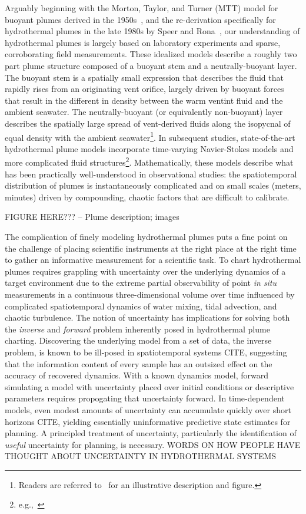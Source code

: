 Arguably beginning with the Morton, Taylor, and Turner (MTT) model for buoyant plumes derived in the 1950s~\autocite{morton1956turbulent}, and the re-derivation specifically for hydrothermal plumes in the late 1980s by Speer and Rona~\autocite{speer1989model}, our understanding of hydrothermal plumes is largely based on laboratory experiments and sparse, corroborating field measurements.
These idealized models describe a roughly two part plume structure composed of a buoyant stem and a neutrally-buoyant layer. 
The buoyant stem is a spatially small expression that describes the fluid that rapidly rises from an originating vent orifice, largely driven by buoyant forces that result in the different in density between the warm ventint fluid and the ambient seawater.
The neutrally-buoyant (or equivalently non-buoyant) layer describes the spatially large spread of vent-derived fluids along the isopycnal of equal density with the ambient seawater\footnote{Readers are referred to~\autocite{yoerger2007autonomous} for an illustrative description and figure.}. 
In subsequent studies, state-of-the-art hydrothermal plume models incorporate time-varying Navier-Stokes models and more complicated fluid structures\footnote{e.g.,~\autocite{lavelle2013turbulent,xu2012deep}}.
Mathematically, these models describe what has been practically well-understood in observational studies: the spatiotemporal distribution of plumes is instantaneously complicated and on small scales (meters, minutes) driven by compounding, chaotic factors that are difficult to calibrate.


FIGURE HERE??? -- Plume description; images


The complication of finely modeling hydrothermal plumes puts a fine point on the challenge of placing scientific instruments at the right place at the right time to gather an informative measurement for a scientific task.
To chart hydrothermal plumes requires grappling with uncertainty over the underlying dynamics of a target environment due to the extreme partial observability of point \emph{in situ} measurements in a continuous three-dimensional volume over time influenced by complicated spatiotemporal dynamics of water mixing, tidal advection, and chaotic turbulence.
The notion of uncertainty has implications for solving both the \emph{inverse} and \emph{forward} problem inherently posed in hydrothermal plume charting.
Discovering the underlying model from a set of data, the inverse problem, is known to be ill-posed in spatiotemporal systems CITE, suggesting that the information content of every sample has an outsized effect on the accuracy of recovered dynamics.
With a known dynamics model, forward simulating a model with uncertainty placed over initial conditions or descriptive parameters requires propogating that uncertainty forward.
In time-dependent models, even modest amounts of uncertainty can accumulate quickly over short horizons CITE, yielding essentially uninformative predictive state estimates for planning.
A principled treatment of uncertainty, particularly the identification of \emph{useful} uncertainty for planning, is necessary. 
WORDS ON HOW PEOPLE HAVE THOUGHT ABOUT UNCERTAINTY IN HYDROTHERMAL SYSTEMS



